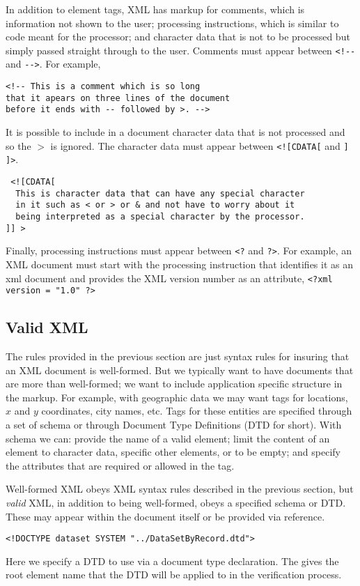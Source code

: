 In addition to element tags, XML has markup for comments, which is
information not shown to the user; processing instructions, which is
similar to code meant for the processor; and character data that is
not to be processed but simply passed straight through to the user.
Comments must appear between \verb+<!--+ and
\verb+-->+. For example, 
\begin{verbatim}
<!-- This is a comment which is so long 
that it apears on three lines of the document
before it ends with -- followed by >. -->
\end{verbatim} 
It is possible to include in a document character
data that is not processed and so the $>$ is ignored.  The character
data must appear between \verb+<![CDATA[+ and
\verb+] ]>+.  
\begin{verbatim}
 <![CDATA[ 
  This is character data that can have any special character 
  in it such as < or > or & and not have to worry about it 
  being interpreted as a special character by the processor.  
]] > 
\end{verbatim} 
Finally, processing instructions must appear between
\verb+<?+ and \verb+?>+.  For example, an XML
document must start with the processing instruction that identifies it
as an xml document and provides the XML version number as an
attribute, \verb+<?xml version = "1.0" ?>+

\subsection{Valid XML}
The rules provided in the previous section are just syntax rules
for insuring that an XML document is well-formed. But we typically want to
have documents that are more than well-formed; we want to include application specific 
structure in the markup. 
For example, with geographic data we may want tags for locations, 
$x$ and $y$ coordinates, city names, etc.  
Tags for these entities are specified through
a set of schema or through Document Type Definitions (DTD for short).
With schema we can: provide the name of a valid element; limit the content
of an element to character data, specific other elements, or to be empty;
and specify the attributes that are required or allowed in the tag.

Well-formed XML obeys XML syntax rules described in the previous section, 
but \textit{valid} XML, in addition to being well-formed, 
obeys a specified schema or DTD.  These may appear within the document
itself or be provided via reference. 
\begin{verbatim}
<!DOCTYPE dataset SYSTEM "../DataSetByRecord.dtd">
\end{verbatim}
Here we specify a DTD to use via a document type declaration.
The  gives the root element name that the DTD
will be applied to in the verification process.

